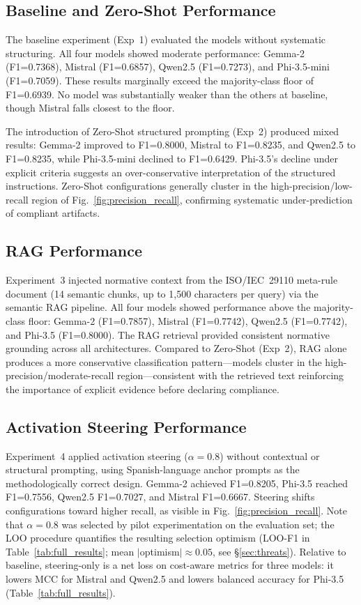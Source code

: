 \documentclass{ieeeaccess}
\begin{document}
\subsection{Baseline and Zero-Shot Performance}

The baseline experiment (Exp~1) evaluated the models without systematic structuring. All four models showed moderate performance: Gemma-2 (F1=0.7368), Mistral (F1=0.6857), Qwen2.5 (F1=0.7273), and Phi-3.5-mini (F1=0.7059). These results marginally exceed the majority-class floor of F1=0.6939. No model was substantially weaker than the others at baseline, though Mistral falls closest to the floor.

The introduction of Zero-Shot structured prompting (Exp~2) produced mixed results: Gemma-2 improved to F1=0.8000, Mistral to F1=0.8235, and Qwen2.5 to F1=0.8235, while Phi-3.5-mini declined to F1=0.6429. Phi-3.5's decline under explicit criteria suggests an over-conservative interpretation of the structured instructions. Zero-Shot configurations generally cluster in the high-precision/low-recall region of Fig.~\ref{fig:precision_recall}, confirming systematic under-prediction of compliant artifacts.

\subsection{RAG Performance}

Experiment~3 injected normative context from the ISO/IEC~29110 meta-rule document (14 semantic chunks, up to 1,500 characters per query) via the semantic RAG pipeline. All four models showed performance above the majority-class floor: Gemma-2 (F1=0.7857), Mistral (F1=0.7742), Qwen2.5 (F1=0.7742), and Phi-3.5 (F1=0.8000). The RAG retrieval provided consistent normative grounding across all architectures. Compared to Zero-Shot (Exp~2), RAG alone produces a more conservative classification pattern---models cluster in the high-precision/moderate-recall region---consistent with the retrieved text reinforcing the importance of explicit evidence before declaring compliance.

\subsection{Activation Steering Performance}

Experiment~4 applied activation steering ($\alpha=0.8$) without contextual or structural prompting, using Spanish-language anchor prompts as the methodologically correct design. Gemma-2 achieved F1=0.8205, Phi-3.5 reached F1=0.7556, Qwen2.5 F1=0.7027, and Mistral F1=0.6667. Steering shifts configurations toward higher recall, as visible in Fig.~\ref{fig:precision_recall}. Note that $\alpha=0.8$ was selected by pilot experimentation on the evaluation set; the LOO procedure quantifies the resulting selection optimism (LOO-F1 in Table~\ref{tab:full_results}; mean $|$optimism$| \approx 0.05$, see §\ref{sec:threats}). Relative to baseline, steering-only is a net loss on cost-aware metrics for three models: it lowers MCC for Mistral and Qwen2.5 and lowers balanced accuracy for Phi-3.5 (Table~\ref{tab:full_results}).
\end{document}
